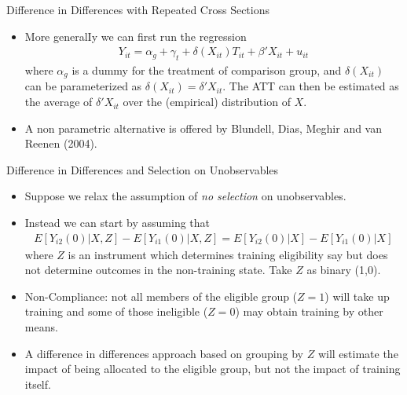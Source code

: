 \documentclass[xcolor=pdftex,dvipsnames,table,mathserif,aspectratio=169]{beamer}
\begin{document}
\begin{frame}{Difference in Differences with Repeated Cross Sections}
\begin{itemize}
\item More generalIy we can first run the regression 
\begin{align*}
Y_{it} = \alpha_g + \gamma_t + \delta (X_{it}) T_{it} + \beta' X_{it} + u_{it}
\end{align*} 
where $\alpha_g$ is a dummy for the treatment of comparison group, and $\delta (X_{it})$ can be parameterized as $\delta(X_{it}) = \delta' X_{it}$. The ATT can then be estimated as the average of $\delta' X_{it}$ over the (empirical) distribution of $X$.
\item A non parametric alternative is offered by Blundell, Dias, Meghir and van Reenen (2004).
\end{itemize}
\end{frame}

\begin{frame}{Difference in Differences and Selection on Unobservables}
\begin{itemize}
\item Suppose we relax the assumption of \emph{no selection} on unobservables. 
\item Instead we can start by assuming that
\begin{align*}
E[Y_{i2}(0) | X,Z] - E[Y_{i1}(0) | X,Z] = E[Y_{i2}(0) | X] - E[Y_{i1}(0) | X]
\end{align*} 
where $Z$ is an instrument which determines training eligibility say but does not determine outcomes in the non-training state. Take $Z$ as binary (1,0).
\item Non-Compliance: not all members of the eligible group ($Z = 1$) will take up training and some of those ineligible ($Z = 0$) may obtain training by other means.
\item A difference in differences approach based on grouping by $Z$ will estimate the impact of being allocated to the eligible group, but not the impact of training itself.
\end{itemize}
\end{frame}
\end{document}
